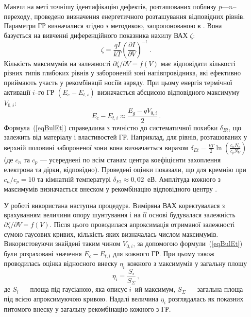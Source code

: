 Маючи на меті точнішу ідентифікацію дефектів, розташованих поблизу $p$---$n$--переходу,
проведено визначення енергетичного розташування відповідних рівнів.
Параметри ГР визначалися згідно з методикою, запропонованою в \cite{Bulyar}.
Вона базується на вивченні диференційного показника нахилу ВАХ $\zeta$:
\begin{equation}\label{BetaVAX}
  \zeta=\frac{qI}{kT}\left(\frac{\partial I}{\partial V}\right)^{-1}\,.
\end{equation}
Кількість максимумів на залежності $\partial \zeta/ \partial V = f (V)$ має відповідати кількості різних типів глибоких
рівнів у забороненій зоні напівпровідника,
які ефективно приймають участь у рекомбінації носіїв заряду.
При цьому енергія термічної активації $i$--го ГР $(E_c-E_{t,i})$ визначається абсцисою
відповідного максимуму $V_{0,i}$:
\begin{equation}\label{eqBulEt}
  E_c-E_{t,i}\approx \frac{E_g-q V_{0,i}}{2}\,.
\end{equation}
Формула~(\ref{eqBulEt}) справедлива з точністю до систематичної похибки $\delta_{Et}$,
що залежить від матеріалу і властивостей ГР.
Наприклад, для рівнів, розташованих у верхній половині забороненої зони вона визначається виразом
$\delta_{Et}=\frac{kT}{2}\ln\left(\frac{c_n N_c}{c_p N_V}\right)$
(де $c_n$ та $c_p$ --- усереднені по всім станам центра коефіцієнти захоплення електрона та дірки, відповідно).
Проведені оцінки показали, що для кремнію при $c_n/c_p=10$ та кімнатній температурі $\delta_{Et}\approx0,02$~еВ.
Амплітуда кожного з максимумів визначається внеском у рекомбінацію відповідного центру \cite{Bulyar}.

У роботі використана наступна процедура.
Виміряна ВАХ коректувалася з врахуванням величини  опору шунтування і на її основі будувалася залежність $\partial \zeta/ \partial V = f (V)$.
Після цього проводилася апроксимація отриманої залежності сумою гаусових кривих,
кількість яких визначалась числом максимумів.
Використовуючи знайдені таким чином $V_{0,i}$, за допомогою формули~(\ref{eqBulEt}) були розраховані
значення $E_c-E_{t,i}$ для кожного ГР.
При цьому також проводилась оцінка відносного внеску $\eta_i$ кожного з максимумів у загальну площу
\begin{equation}\label{eqBulEta}
  \eta_i=\frac{S_i}{S_\Sigma}\,,
\end{equation}
де
$S_i$ --- площа під гаусіаною, яка описує $i$--ий максимум,
$S_\Sigma$ --- загальна площа під всією апроксимуючою кривою.
Надалі величина $\eta_i$ розглядалась як показних питомого внеску у загальну рекомбінацію
кожного з ГР.

